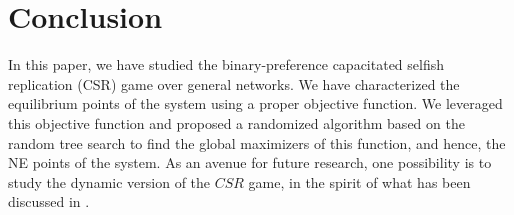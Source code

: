 \section{Conclusion}\label{sec:conclusion}
In this paper, we have studied the binary-preference capacitated selfish replication (CSR) game over general networks. We have characterized the equilibrium points of the system using a proper objective function. We leveraged this objective function and proposed a randomized algorithm based on the random tree search to find the global maximizers of this function, and hence, the NE points of the system. As an avenue for future research, one possibility is to study the dynamic version of the $CSR$ game, in the spirit of what has been discussed in \cite{fabrikant2003network}.

